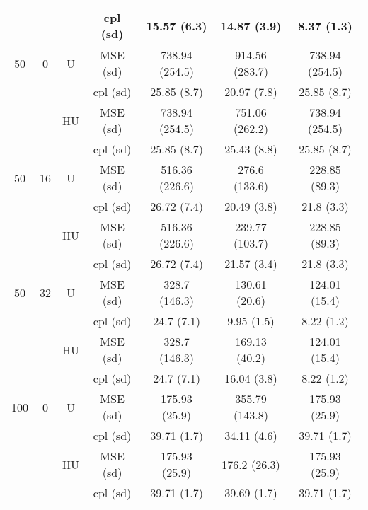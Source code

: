 \documentclass[11pt,a4paper]{article}
\begin{document}
\begin{table}[h!]
\begin{tabular}{|c|c|c|c|c|c|c|}
& & & cpl (sd) & 15.57 (6.3) & 14.87 (3.9) & 8.37 (1.3) \\
\hline
\hline %
50 & 0 & U&MSE (sd) & 738.94 (254.5) & 914.56 (283.7) & 738.94 (254.5) \\
& & & cpl (sd) & 25.85 (8.7) & 20.97 (7.8) & 25.85 (8.7) \\
 &  & HU &MSE (sd) & 738.94 (254.5) & 751.06 (262.2) & 738.94 (254.5) \\
& & & cpl (sd) & 25.85 (8.7) & 25.43 (8.8) & 25.85 (8.7) \\
\hline %
50 & 16 & U&	MSE (sd) & 516.36 (226.6) & 276.6 (133.6) & 228.85 (89.3) \\
& & & cpl (sd) & 26.72 (7.4) & 20.49 (3.8) & 21.8 (3.3) \\
 &  &HU &MSE (sd) & 516.36 (226.6) & 239.77 (103.7) & 228.85 (89.3) \\
& & & cpl (sd) & 26.72 (7.4) & 21.57 (3.4) & 21.8 (3.3) \\
\hline %
50 & 32 & U&MSE (sd) & 328.7 (146.3) & 130.61 (20.6) & 124.01 (15.4) \\
& & & cpl (sd) & 24.7 (7.1) & 9.95 (1.5) & 8.22 (1.2) \\
 &  &HU &MSE (sd) & 328.7 (146.3) & 169.13 (40.2) & 124.01 (15.4) \\
& & &cpl (sd) & 24.7 (7.1) & 16.04 (3.8) & 8.22 (1.2) \\
\hline
\hline %
100 & 0 & U& MSE (sd) & 175.93 (25.9) & 355.79 (143.8) & 175.93 (25.9) \\
& & & cpl (sd) & 39.71 (1.7) & 34.11 (4.6) & 39.71 (1.7) \\
 &  &HU &  MSE (sd) & 175.93 (25.9) & 176.2 (26.3) & 175.93 (25.9) \\
& & &  cpl (sd) & 39.71 (1.7) & 39.69 (1.7) & 39.71 (1.7) \\
\hline %

\end{tabular}
\end{table}
\end{document}
